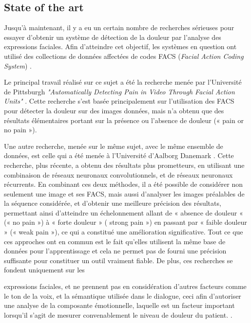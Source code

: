 \documentclass[11pt]{article}
\begin{document}
\subsection{State of the art}
\label{sec:org478492c}
Jusqu’à maintenant, il y a eu un certain nombre de recherches sérieuses pour essayer
d’obtenir un système de détection de la douleur par l’analyse des expressions faciales. Afin
d’atteindre cet objectif, les systèmes en question ont utilisé des collections de données affectées de
codes FACS (\emph{Facial Action Coding System}) \cite{lucey2011painful}.

Le principal travail réalisé sur ce sujet a été la recherche menée par l’Université de Pittsburgh
\emph{"Automatically Detecting Pain in Video Through Facial Action
Units"} \cite{lucey2011automatically}. Cette recherche s’est basée
principalement sur l’utilisation des FACS pour détecter la douleur sur des images données, mais n’a
obtenu que des résultats élémentaires portant sur la présence ou l’absence de douleur (« pain or no
pain »).

Une autre recherche, menée sur le même sujet, avec le même ensemble de données, est celle
qui a été menée à l’Université d’Aalborg Danemark \cite{bellantonio2016spatio}.
Cette recherche, plus récente, a
obtenu des résultats plus prometteurs, en utilisant une combinaison de réseaux neuronaux
convolutionnels, et de réseaux neuronaux récurrents. En combinant ces deux méthodes, il a été
possible de considérer non seulement une image et ses FACS, mais aussi d’analyser les images
préalables de la séquence considérée, et d’obtenir une meilleure précision des résultats, permettant
ainsi d’atteindre un échelonnement allant de « absence de douleur « (« no pain ») à « forte
douleur » ( strong pain ») en passant par « faible douleur » (« weak pain »), ce qui a constitué une
amélioration significative.
Tout ce que ces approches ont en commun est le fait qu’elles utilisent la même base de
données pour l’apprentissage et cela ne permet pas de fourni une précision suffisante pour
constituer un outil vraiment fiable. De plus, ces recherches se fondent uniquement sur les

expressions faciales, et ne prennent pas en considération d’autres facteurs comme le ton de la voix,
et la sémantique utilisée dans le dialogue, ceci afin d’autoriser une analyse de la composante
émotionnelle, laquelle est un facteur important lorsqu’il s’agit de mesurer convenablement le niveau
de douleur du patient. \cite{hale1997emotional}.
\end{document}

